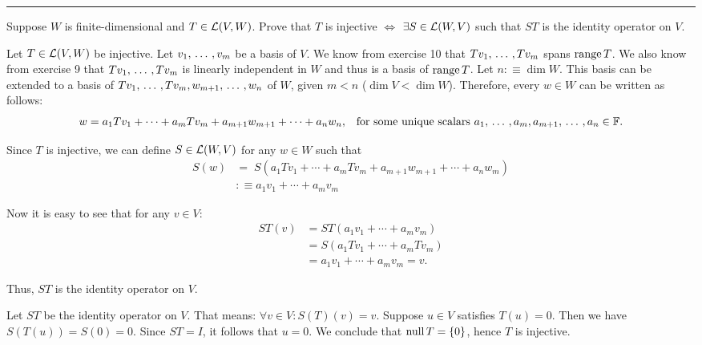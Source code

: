 \hrule

\begin{xrcs}
  Suppose $W$ is finite-dimensional and $T\in \mathcal{L}(V,W)$. Prove that $T$ is injective $\iff$ $\exists S \in \mathcal{L}(W,V)$ such that $ST$ is the identity operator on $V$.
\end{xrcs}
\begin{prf}
  \Rightarrowdirection Let $T \in \mathcal{L} (V,W)$ be injective. Let $v_1, {\, \ldots \,\,}, v_m$ be a basis of $V$. We know from exercise 10 that $T v_1, {\, \ldots \,\,}, Tv_m$ spans $\operatorname{range} T$. We also know from exercise 9 that $T v_1, {\, \ldots \,\,}, Tv_m$ is linearly independent in $W$ and thus is a basis of $\operatorname{range} T$. Let $n :\equiv \dim W$. This basis can be extended to a basis of $T v_1, {\, \ldots \,\,}, Tv_m, w_{m+1}, {\, \ldots \,\,}, w_n$ of $W$, given $m < n$ ($\dim V < \dim W$). Therefore, every $w \in W$ can be written as follows:
  \begin{equation}
    w = a_1 T v_1 + \cdots + a_m T v_m + a_{m+1} w_{m+1} + \cdots + a_{n} w_n,
    \quad
    $for some unique scalars $ a_1, \ddd, a_m, a_{m+1}, \ddd, a_n \in \myF.
  \end{equation}

  Since $T$ is injective, we can define $S \in \mathcal{L} (W,V)$ for any $w \in W$ such that
  \begin{equation}
    \begin{aligned}
      S(w) &= \;  S(a_1 T v_1 + \cdots + a_m T v_m + a_{m+1} w_{m+1} + \cdots + a_{n} w_m)  \\
           &:\equiv a_1 v_1 + \cdots + a_m v_m
    \end{aligned}
  \end{equation}

  Now it is easy to see that for any $v \in V$:
  \begin{equation}
    \begin{aligned}
      ST(v) &= ST(a_1 v_1 + \cdots + a_m v_m) \\
            &= S(a_1 T v_1 + \cdots + a_m T v_m) \\
            &= a_1 v_1 + \cdots + a_m v_m = v.
    \end{aligned}
  \end{equation}

  Thus, $ST$ is the identity operator on $V$.

  \Leftarrowdirection Let $ST$ be the identity operator on $V$. That means: $\forall v \in V: S(T)(v) = v$. Suppose $u \in V$ satisfies $T(u) = 0$. Then we have $S(T(u)) = S(0) = 0$. Since $ST = I$, it follows that $u = 0$. We conclude that $\operatorname{null} T = \{0\}$, hence $T$ is injective.
\end{prf}
